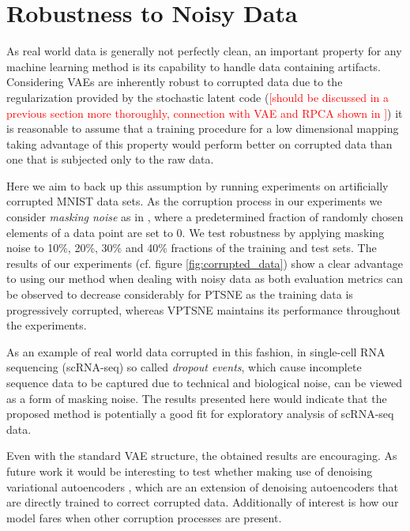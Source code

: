 \section{Robustness to Noisy Data}

As real world data is generally not perfectly clean, an important property for any machine learning method is its capability to handle data containing artifacts. Considering VAEs are inherently robust to corrupted data due to the regularization provided by the stochastic latent code (\textcolor{red}{[should be discussed in a previous section more thoroughly, connection with VAE and RPCA \citep{rpca_1, rpca_2} shown in \citep{hidden_talents_of_the_vae}]}) it is reasonable to assume that a training procedure for a low dimensional mapping taking advantage of this property would perform better on corrupted data than one that is subjected only to the raw data.

Here we aim to back up this assumption by running experiments on artificially corrupted MNIST data sets. As the corruption process in our experiments we consider \textit{masking noise} as in \cite{stacked_denoising_ae}, where a predetermined fraction of randomly chosen elements of a data point are set to 0. We test robustness by applying masking noise to 10\%, 20\%, 30\% and 40\% fractions of the training and test sets. The results of our experiments (cf. figure \ref{fig:corrupted_data}) show a clear advantage to using our method when dealing with noisy data as both evaluation metrics can be observed to decrease considerably for PTSNE as the training data is progressively corrupted, whereas VPTSNE maintains its performance throughout the experiments.

As an example of real world data corrupted in this fashion, in single-cell RNA sequencing (scRNA-seq) so called \textit{dropout events}, which cause incomplete sequence data to be captured due to technical and biological noise, can be viewed as a form of masking noise. The results presented here would indicate that the proposed method is potentially a good fit for exploratory analysis of scRNA-seq data.


Even with the standard VAE structure, the obtained results are encouraging. As future work it would be interesting to test whether making use of denoising variational autoencoders \cite{denoising_vae}, which are an extension of denoising autoencoders \cite{stacked_denoising_ae} that are directly trained to correct corrupted data. Additionally of interest is how our model fares when other corruption processes are present.

